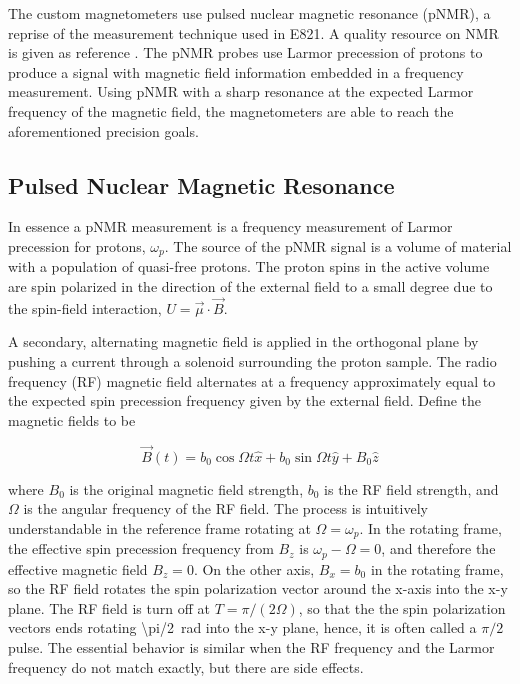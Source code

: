 The custom magnetometers use pulsed nuclear magnetic resonance (pNMR), a reprise of the measurement technique used in E821.  A quality resource on NMR is given as reference \cite{keeler-nmr}.  The pNMR probes use Larmor precession of protons to produce a signal with magnetic field information embedded in a frequency measurement.  Using pNMR with a sharp resonance at the expected Larmor frequency of the \gmtwo magnetic field, the magnetometers are able to reach the aforementioned precision goals.

\subsection{Pulsed Nuclear Magnetic Resonance}

In essence a pNMR measurement is a frequency measurement of Larmor precession for protons, $\omega_p$.  The source of the pNMR signal is a volume of material with a population of quasi-free protons.  The proton spins in the active volume are spin polarized in the direction of the external field to a small degree due to the spin-field interaction, $U = \vec{\mu} \cdot \vec{B}$.

A secondary, alternating magnetic field is applied in the orthogonal plane by pushing a current through a solenoid surrounding the proton sample.  The radio frequency (RF) magnetic field alternates at a frequency approximately equal to the expected spin precession frequency given by the external field.  Define the magnetic fields to be

\begin{equation}
\label{eqn:pnmr-field-with-rf}
\vec{B}(t) = b_0 \cos{\Omega t} \hat{x} + b_0 \sin{\Omega t} \hat{y} + B_0 \hat{z}
\end{equation}

\noindent
where $B_0$ is the original magnetic field strength, $b_0$ is the RF field strength, and $\Omega$ is the angular frequency of the RF field.  The process is intuitively understandable in the reference frame rotating at $\Omega = \omega_p$.  In the rotating frame, the effective spin precession frequency from $B_z$ is $\omega_p - \Omega = 0$, and therefore the effective magnetic field $B_z = 0$.  On the other axis, $B_x = b_0$ in the rotating frame, so the RF field rotates the spin polarization vector around the x-axis into the x-y plane.  The RF field is turn off at $T = \pi / (2 \Omega)$, so that the the spin polarization vectors ends rotating \SI{\pi/2}{\radian} into the x-y plane, hence, it is often called a $\pi/2$ pulse.  The essential behavior is similar when the RF frequency and the Larmor frequency do not match exactly, but there are side effects.


